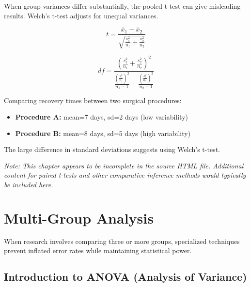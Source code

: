 \documentclass[
  11pt,
  letterpaper,
  oneside]{book}
\providecommand{\tightlist}{%
  \setlength{\itemsep}{0pt}\setlength{\parskip}{0pt}}\usepackage{longtable,booktabs,array}
\begin{document}
When group variances differ substantially, the pooled t-test can give
misleading results. Welch's t-test adjusts for unequal variances.

\[t = \frac{\bar{x}_1 - \bar{x}_2}{\sqrt{\frac{s_1^2}{n_1} + \frac{s_2^2}{n_2}}}\]

\[df = \frac{\left(\frac{s_1^2}{n_1} + \frac{s_2^2}{n_2}\right)^2}{\frac{\left(\frac{s_1^2}{n_1}\right)^2}{n_1-1} + \frac{\left(\frac{s_2^2}{n_2}\right)^2}{n_2-1}}\]

\begin{tcolorbox}[enhanced jigsaw, toprule=.15mm, left=2mm, opacitybacktitle=0.6, colframe=quarto-callout-tip-color-frame, leftrule=.75mm, titlerule=0mm, coltitle=black, colbacktitle=quarto-callout-tip-color!10!white, toptitle=1mm, title=\textcolor{quarto-callout-tip-color}{\faLightbulb}\hspace{0.5em}{When Variances Differ}, bottomtitle=1mm, arc=.35mm, rightrule=.15mm, bottomrule=.15mm, breakable, opacityback=0, colback=white]

Comparing recovery times between two surgical procedures:

\begin{itemize}
\tightlist
\item
  \textbf{Procedure A:} mean=7 days, sd=2 days (low variability)
\item
  \textbf{Procedure B:} mean=8 days, sd=5 days (high variability)
\end{itemize}

The large difference in standard deviations suggests using Welch's
t-test.

\end{tcolorbox}

\emph{Note: This chapter appears to be incomplete in the source HTML
file. Additional content for paired t-tests and other comparative
inference methods would typically be included here.}


\chapter{Multi-Group Analysis}\label{multi-group-analysis}

When research involves comparing three or more groups, specialized
techniques prevent inflated error rates while maintaining statistical
power.

\section{Introduction to ANOVA (Analysis of
Variance)}\label{introduction-to-anova-analysis-of-variance}
\end{document}
